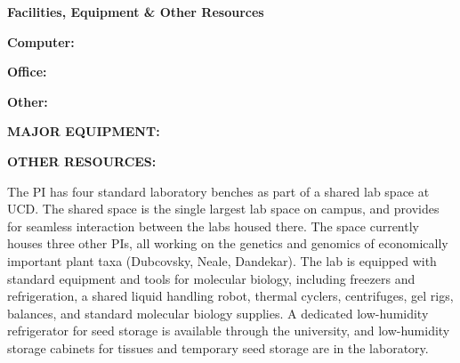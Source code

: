 
\setcounter{page}{1}
\renewcommand{\thepage}{Facilities, Equipment, and Other Resources - Page \arabic{page} of 1}

\begin{center}
\textbf{\large Facilities, Equipment \& Other Resources}
\end{center}


% 
% 

\textbf{Computer:}


\textbf{Office:}

\textbf{Other:}

\textbf{MAJOR EQUIPMENT:}


\textbf{OTHER RESOURCES:}


The PI has four standard laboratory benches as part of a shared lab space at UCD.  The shared space is the single largest lab space on campus, and provides for seamless interaction between the labs housed there.  The space currently houses three other PIs, all working on the genetics and genomics of economically important plant taxa (Dubcovsky, Neale, Dandekar). The lab is equipped with standard equipment and tools for molecular biology, including freezers and refrigeration, a shared liquid handling robot, thermal cyclers, centrifuges, gel rigs, balances, and standard molecular biology supplies.  A dedicated low-humidity refrigerator for seed storage is available through the university, and low-humidity storage cabinets for tissues and temporary seed storage are in the laboratory.

